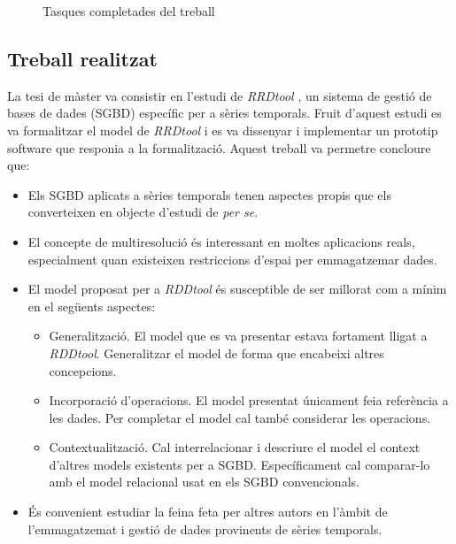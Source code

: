 \begin{figure}[tp]





\caption{Tasques completades del treball}
\label{fig:pla:futur}
\end{figure}



\subsection{Treball realitzat}


La tesi de màster \parencite{llusa11:tfm} va consistir en l'estudi de
\emph{RRDtool} \parencite{rrdtool}, un sistema de gestió de bases de
dades (SGBD) específic per a sèries temporals.
%
Fruit d'aquest estudi es va formalitzar el model de \emph{RRDtool} i es va
dissenyar i implementar un prototip software que responia a la
formalització.
%
Aquest treball va permetre concloure que:
\begin{itemize}
\item Els SGBD aplicats a sèries temporals tenen aspectes propis que
  els converteixen en objecte d'estudi de \emph{per se}.
\item El concepte de multiresolució és interessant en moltes
  aplicacions reals, especialment quan existeixen restriccions d'espai
  per emmagatzemar dades.
\item El model proposat per a \emph{RDDtool} és susceptible de ser millorat
  com a mínim en el següents aspectes:
  \begin{itemize}
  \item Generalització. El model que es va presentar estava fortament
    lligat a \emph{RDDtool}. Generalitzar el model de forma que encabeixi
    altres concepcions.
  \item Incorporació d'operacions. El model presentat únicament feia
    referència a les dades. Per completar el
    model cal també considerar les operacions.
  \item Contextualització. Cal interrelacionar i descriure el model el
    context d'altres models existents per a SGBD. Específicament cal
    comparar-lo amb el model relacional usat en els SGBD
    convencionals.
  \end{itemize}
\item És convenient estudiar la feina feta per altres autors en
  l'àmbit de l'emmagatzemat i gestió de dades provinents de sèries
  temporals.
\end{itemize}

